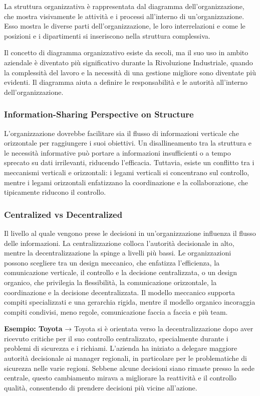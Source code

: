\documentclass{article}
\begin{document}
La struttura organizzativa è rappresentata dal diagramma dell’organizzazione, che mostra visivamente le attività e i processi all’interno di un’organizzazione. Esso mostra le diverse parti dell’organizzazione, le loro interrelazioni e come le posizioni e i dipartimenti si inseriscono nella struttura complessiva.

Il concetto di diagramma organizzativo esiste da secoli, ma il suo uso in ambito aziendale è diventato più significativo durante la Rivoluzione Industriale, quando la complessità del lavoro e la necessità di una gestione migliore sono diventate più evidenti. Il diagramma aiuta a definire le responsabilità e le autorità all’interno dell’organizzazione.

\subsubsection{Information-Sharing Perspective on Structure}

L’organizzazione dovrebbe facilitare sia il flusso di informazioni verticale che orizzontale per raggiungere i suoi obiettivi. Un disallineamento tra la struttura e le necessità informative può portare a informazioni insufficienti o a tempo sprecato su dati irrilevanti, riducendo l’efficacia. Tuttavia, esiste un conflitto tra i meccanismi verticali e orizzontali: i legami verticali si concentrano sul controllo, mentre i legami orizzontali enfatizzano la coordinazione e la collaborazione, che tipicamente riducono il controllo.

\subsubsection{Centralized vs Decentralized}

Il livello al quale vengono prese le decisioni in un’organizzazione influenza il flusso delle informazioni. La centralizzazione colloca l’autorità decisionale in alto, mentre la decentralizzazione la spinge a livelli più bassi. Le organizzazioni possono scegliere tra un design meccanico, che enfatizza l’efficienza, la comunicazione verticale, il controllo e la decisione centralizzata, o un design organico, che privilegia la flessibilità, la comunicazione orizzontale, la coordinazione e la decisione decentralizzata. Il modello meccanico supporta compiti specializzati e una gerarchia rigida, mentre il modello organico incoraggia compiti condivisi, meno regole, comunicazione faccia a faccia e più team.

\textbf{Esempio: Toyota} → Toyota si è orientata verso la decentralizzazione dopo aver ricevuto critiche per il suo controllo centralizzato, specialmente durante i problemi di sicurezza e i richiami. L’azienda ha iniziato a delegare maggiore autorità decisionale ai manager regionali, in particolare per le problematiche di sicurezza nelle varie regioni. Sebbene alcune decisioni siano rimaste presso la sede centrale, questo cambiamento mirava a migliorare la reattività e il controllo qualità, consentendo di prendere decisioni più vicine all’azione.
\end{document}
